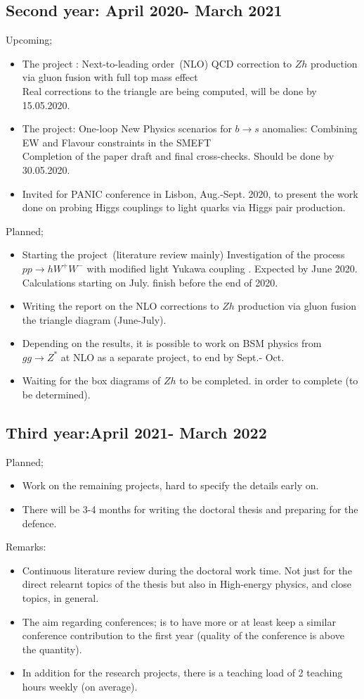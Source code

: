 \documentclass[12pt]{article}
\begin{document}
 \subsection*{Second year: April 2020- March 2021}
Upcoming;
 \begin{itemize}
 	\item The project : Next-to-leading order~(NLO) QCD correction to $Zh$ production via gluon fusion  with full top mass effect\\ Real corrections to the triangle are being computed, will be done by 15.05.2020.  
 	\item The project:  One-loop New Physics scenarios for $b \to s$ anomalies: Combining EW and Flavour constraints in the SMEFT \\  Completion of the paper draft and final cross-checks. Should be done by 30.05.2020. 
	\item Invited for PANIC conference in Lisbon, Aug.-Sept. 2020, to present the work done on probing Higgs couplings to light quarks via Higgs pair production.
\end{itemize}
Planned;
 \begin{itemize}
	\item Starting the project~(literature review mainly)  Investigation of the process $  pp \to h W^+ W^-$  with modified  light Yukawa coupling . Expected by June 2020. Calculations starting on  July. finish before the end of 2020. 
	\item Writing the report on the NLO corrections to  $Zh$ production via gluon fusion the triangle diagram (June-July).
	\item Depending on the results, it is possible to work on BSM physics from $gg\to Z^*$ at NLO as a separate project, to end by Sept.- Oct.
	\item Waiting for the box diagrams of $Zh$ to be completed. in order to complete (to be determined).
\end{itemize}
 \subsection*{Third year:April 2021- March 2022}
Planned;
\begin{itemize}
	\item Work on the remaining projects, hard to specify the details early on. 
	\item There will be 3-4 months for writing the doctoral thesis and preparing for the defence. 
\end{itemize}
Remarks:
\begin{itemize}
	\item  Continuous literature review during the doctoral work time. Not just for the direct relearnt topics of the thesis but also in High-energy physics, and close topics, in general.
	\item The aim regarding conferences; is to have more or at least  keep a similar conference contribution to the first year (quality of the conference is above the quantity).
	\item In addition for the research projects, there is a teaching load of  2 teaching hours weekly (on average).
\end{itemize}



\end{document}

